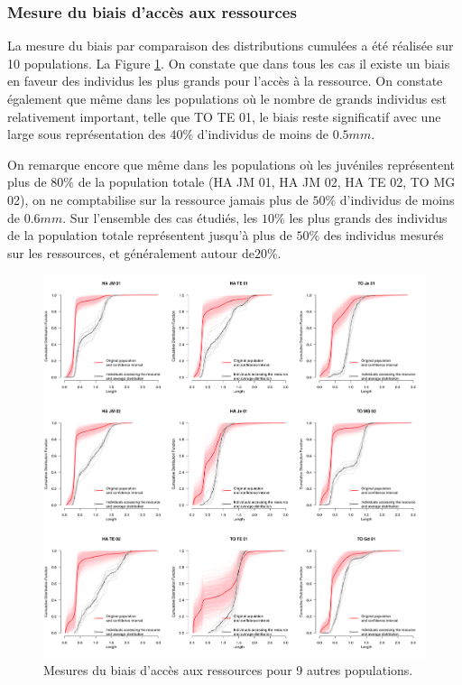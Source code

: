 \subsubsection{Mesure du biais d'accès aux ressources}

La mesure du biais par comparaison des distributions cumulées a été réalisée sur
10 populations. La Figure \ref{fig:SM7}. On constate que dans tous les cas il
existe un biais en faveur des individus les plus grands pour l'accès à la
ressource. On constate également que même dans les populations où le nombre de
grands individus est relativement important, telle que TO TE 01, le biais reste
significatif avec une large sous représentation des $40\%$ d'individus de moins
de $0.5mm$. 

On remarque encore que même dans les populations où les juvéniles représentent
plus de $80\%$ de la population totale (HA JM 01, HA JM 02, HA TE 02, TO MG 02),
on ne comptabilise sur la ressource jamais plus de $50\%$ d'individus de moins
de $0.6mm$. Sur l'ensemble des cas étudiés, les $10\%$ les plus grands des
individus de la population totale représentent jusqu'à plus de $50\%$ des
individus mesurés sur les ressources, et généralement autour de$20\%$.

\begin{figure}[!ht]
\begin{center}
\includegraphics[width=1\textwidth]{1_CorpsDeThese/Resumes/Fig/SM07}
\caption[Mesures du biais
d'accès aux ressources]{Mesures du biais
d'accès aux ressources pour 9 autres populations.}
\label{fig:SM7}
\end{center}
\end{figure}

